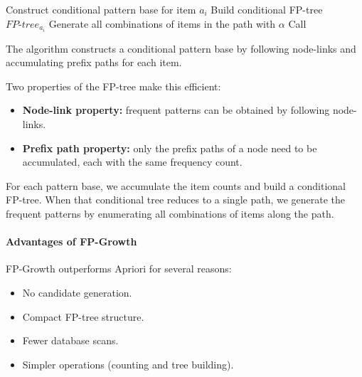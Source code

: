 \begin{algorithm}
\caption{FP-Growth Algorithm}
\begin{algorithmic}[1]
        \State Construct conditional pattern base for item $a_i$
        \State Build conditional FP-tree $FP\text{-}tree_{a_i}$
         
             
                \State Generate all combinations of items in the path with $\alpha$
            \Else
                \State Call 
            \EndIf
        \EndIf
    \EndFor
\EndProcedure
\end{algorithmic}
\end{algorithm}

The algorithm constructs a conditional pattern base by following node-links and accumulating prefix paths for each item.

Two properties of the FP-tree make this efficient:
\begin{itemize}
    \item \textbf{Node-link property:} frequent patterns can be obtained by following node-links.
    \item \textbf{Prefix path property:} only the prefix paths of a node need to be accumulated, each with the same frequency count.
\end{itemize}

For each pattern base, we accumulate the item counts and build a conditional FP-tree. When that conditional tree reduces to a single path, we generate the frequent patterns by enumerating all combinations of items along the path.

\paragraph{Advantages of FP-Growth}

FP-Growth outperforms Apriori for several reasons:
\begin{itemize}
    \item No candidate generation.
    \item Compact FP-tree structure.
    \item Fewer database scans.
    \item Simpler operations (counting and tree building).
\end{itemize}

